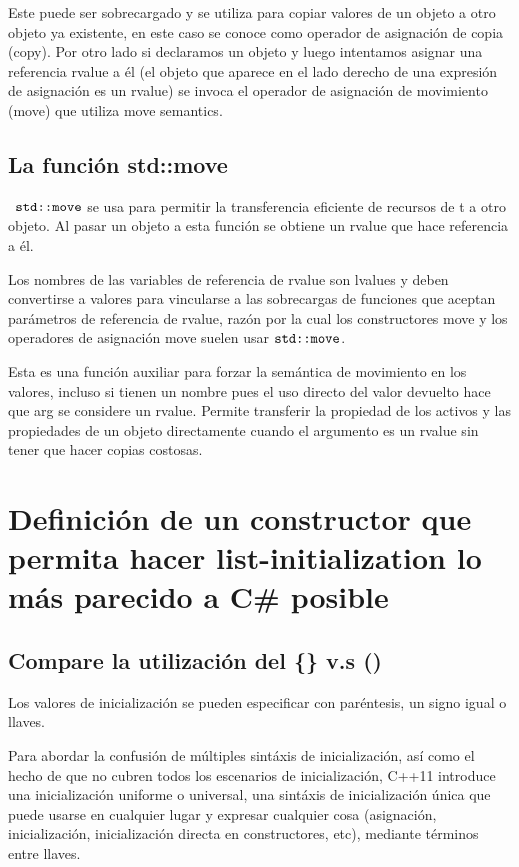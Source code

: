 \documentclass[10pt]{article}
\begin{document}
Este puede ser sobrecargado y se utiliza para copiar valores de un objeto a otro objeto ya existente, en este caso se conoce como operador de asignaci\'on de copia (copy). Por otro lado si declaramos un objeto y luego intentamos asignar una referencia rvalue a él (el objeto que aparece en el lado derecho de una expresión de asignación es un rvalue) se invoca el operador de asignación de movimiento (move) que utiliza move semantics. 

\subsection{La funci\'on std::move}
	\ $ \verb*|std::move| $ se usa para permitir la transferencia eficiente de recursos de t a otro objeto. Al pasar un objeto a esta función se obtiene un rvalue que hace referencia a él. 
	
	Los nombres de las variables de referencia de rvalue son lvalues y deben convertirse a valores para vincularse a las sobrecargas de funciones que aceptan parámetros de referencia de rvalue, razón por la cual los constructores move y los operadores de asignación move suelen usar $ \verb*|std::move| $.
	
	Esta es una función auxiliar para forzar la semántica de movimiento en los valores, incluso si tienen un nombre pues el uso directo del valor devuelto hace que arg se considere un rvalue. Permite transferir la propiedad de los activos y las propiedades de un objeto directamente cuando el argumento es un rvalue sin tener que hacer copias costosas.

\vspace{2em}
\section{Definici\'on de un constructor que permita hacer list-initialization lo más parecido a C\# posible}

\subsection{Compare la utilización del \{\} v.s ()}

Los valores de inicialización se pueden especificar con paréntesis, un signo igual o llaves.

Para abordar la confusión de múltiples sint\'axis de inicialización, así como el hecho de que no cubren todos los escenarios de inicialización, C++11 introduce una inicialización uniforme o universal, una sint\'axis de inicialización única que puede usarse en cualquier lugar y expresar cualquier cosa (asignación, inicialización, inicialización directa en constructores, etc), mediante t\'erminos entre llaves.
\end{document}
